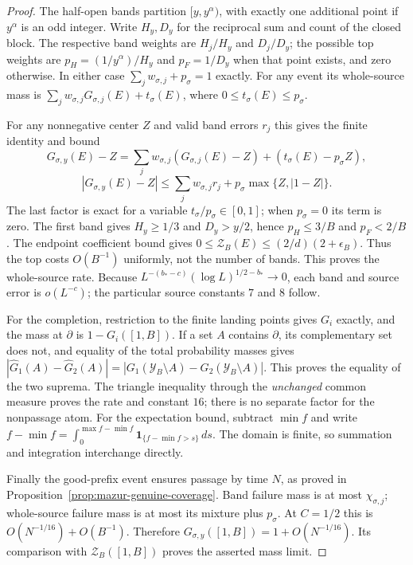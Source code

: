 \documentclass[11pt]{article}
\theoremstyle{remark}\newtheorem{remark}[proposition]{Remark}
\begin{document}
\begin{proof}
The half-open bands partition $[y,y^\alpha)$, with exactly one additional
point if $y^\alpha$ is an odd integer. Write $H_y,D_y$ for the reciprocal
sum and count of the closed block. The respective band weights are
$H_j/H_y$ and $D_j/D_y$; the possible top weights are
$p_H=(1/y^\alpha)/H_y$ and $p_F=1/D_y$ when that point exists, and zero
otherwise. In either case $\sum_jw_{\sigma,j}+p_\sigma=1$ exactly.
For any event its whole-source mass is
$\sum_jw_{\sigma,j}G_{\sigma,j}(E)+t_\sigma(E)$, where
$0\le t_\sigma(E)\le p_\sigma$.

For any nonnegative center $Z$ and valid band errors $r_j$ this gives
the finite identity and bound
\[
 G_{\sigma,y}(E)-Z
 =\sum_jw_{\sigma,j}(G_{\sigma,j}(E)-Z)+(t_\sigma(E)-p_\sigma Z),
\]
\[
 |G_{\sigma,y}(E)-Z|
 \le\sum_jw_{\sigma,j}r_j+
       p_\sigma\max\{Z,|1-Z|\}.
\]
The last factor is exact for a variable $t_\sigma/p_\sigma\in[0,1]$;
when $p_\sigma=0$ its term is zero. The first band gives
$H_y\ge1/3$ and $D_y>y/2$, hence $p_H\le3/B$ and $p_F<2/B$.
The endpoint coefficient bound gives
$0\le\mathcal Z_B(E)\le(2/d)(2+\epsilon_B)$.
Thus the top costs $O(B^{-1})$ uniformly, not the number of bands.
This proves the whole-source rate. Because
$L^{-(b_*-c)}(\log L)^{1/2-b_*}\to0$, each band and source error
is $o(L^{-c})$; the particular source constants $7$ and $8$ follow.

For the completion, restriction to the finite landing points gives $G_i$
exactly, and the mass at $\partial$ is $1-G_i([1,B])$. If a set $A$
contains $\partial$, its complementary set does not, and equality of the
total probability masses gives
$|\widehat G_1(A)-\widehat G_2(A)|
 =|G_1(\mathcal Y_B\setminus A)-G_2(\mathcal Y_B\setminus A)|$.
This proves the equality of the two suprema. The triangle inequality
through the \emph{unchanged} common measure proves the rate and constant
$16$; there is no separate factor for the nonpassage atom.
For the expectation bound, subtract $\min f$ and write
$f-\min f=\int_0^{\max f-\min f}\mathbf1_{\{f-\min f>s\}}\,ds$.
The domain is finite, so summation and integration interchange directly.

Finally the good-prefix event ensures passage by time $N$, as proved in
Proposition~\ref{prop:mazur-genuine-coverage}. Band failure mass is at most
$\chi_{\sigma,j}$; whole-source failure mass is at most its mixture plus
$p_\sigma$. At $C=1/2$ this is $O(N^{-1/16})+O(B^{-1})$.
Therefore $G_{\sigma,y}([1,B])=1+O(N^{-1/16})$.
Its comparison with $\mathcal Z_B([1,B])$ proves the asserted mass limit.
\end{proof}
\end{document}
